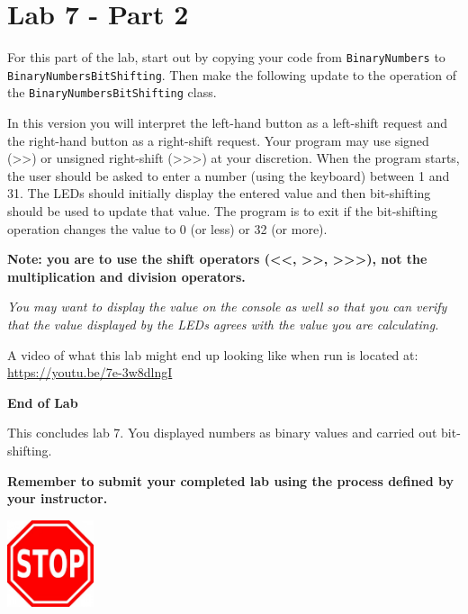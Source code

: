 \newpage

\section{Lab 7 - Part 2}

For this part of the lab, start out by copying your code from \texttt{BinaryNumbers} to \texttt{BinaryNumbersBitShifting}. Then make the following update to the operation of the \texttt{BinaryNumbersBitShifting} class.

In this version you will interpret the left-hand button as a left-shift request and the right-hand button as a right-shift request. Your program may use signed (\textgreater\textgreater) or unsigned right-shift (\textgreater\textgreater\textgreater) at your discretion. When the program starts, the user should be asked to enter a number (using the keyboard) between 1 and 31. The LEDs should initially display the entered value and then bit-shifting should be used to update that value. The program is to  exit if the bit-shifting operation changes the value to 0 (or less) or 32 (or more).

\textbf{Note: you are to use the shift operators (\textless\textless, \textgreater\textgreater, \textgreater\textgreater\textgreater), not the multiplication and division operators.}

\textit{You may want to display the value on the console as well so that you can verify that the value displayed by the LEDs agrees with the value you are calculating.}

A video of what this lab might end up looking like when run is located at: \url{https://youtu.be/7e-3w8dlngI}

\textbf{End of Lab}

This concludes lab 7. You displayed numbers as binary values and carried out bit-shifting.

\textbf{Remember to submit your completed lab using the process defined by your instructor.}

{\centering
	\beforefig
	\centerline{\includegraphics[height=1in]{pi_images/stop_sign_clip_art_16252.jpg}}
	\afterfig
}

